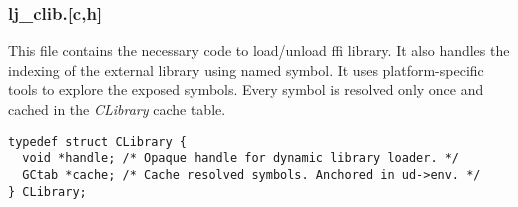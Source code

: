 \subsubsection{lj\_clib.[c,h]}
This file contains the necessary code to load/unload ffi library. It also handles
the indexing of the external library using named symbol. It uses platform-specific tools to explore the exposed symbols. Every symbol is resolved only once
and cached in the \emph{CLibrary} cache table.
\begin{lstlisting}[style=CStyle]
typedef struct CLibrary {
  void *handle; /* Opaque handle for dynamic library loader. */
  GCtab *cache; /* Cache resolved symbols. Anchored in ud->env. */
} CLibrary;
\end{lstlisting}
